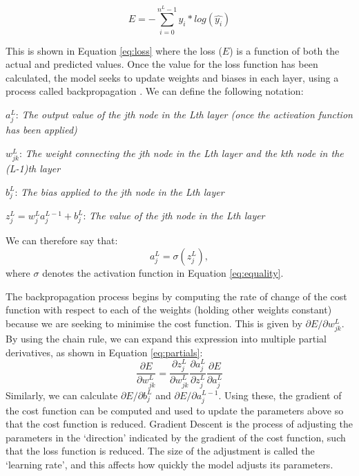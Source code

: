 \begin{equation}\label{eq:loss}
    E = -\sum_{i=0}^{n^L-1} y_i*log(\hat{y_i})
\end{equation}

This is shown in Equation \ref{eq:loss} where the loss ($E$) is a function of both the actual and predicted values. Once the value for the loss function has been calculated, the model seeks to update weights and biases in each layer, using a process called backpropagation \citep{Rumelhart, maths2015Nielsen}. We can define the following notation:

$a_j^L$: \textit{The output value of the jth node in the Lth layer (once the activation function has been applied)}

$w_{jk}^L$: \textit{The weight connecting the jth node in the Lth layer and the kth node in the (L-1)th layer}

$b_j^L$: \textit{The bias applied to the jth node in the Lth layer}

$z_j^L = w_j^L a_j^{L-1} + b_j^L$: \textit{The value of the jth node in the Lth layer}

We can therefore say that:
\begin{equation}\label{eq:equality}
    a_j^L = \sigma(z_j^L),
\end{equation}
where $\sigma$ denotes the activation function in Equation \ref{eq:equality}.

The backpropagation process begins by computing the rate of change of the cost function with respect to each of the weights (holding other weights constant) because we are seeking to minimise the cost function. This is given by $\partial E/ \partial w_{jk}^L$.
By using the chain rule, we can expand this expression into multiple partial derivatives, as shown in Equation \ref{eq:partials}:
\begin{equation}\label{eq:partials}
    \frac{\partial E}{\partial w_{jk}^L} = \frac{\partial z_j^L}{\partial w_{jk}^L} \frac{\partial a_j^L}{\partial z_j^L} \frac{\partial E}{\partial a_j^L} %
\end{equation}
Similarly, we can calculate $\partial E/ \partial b_j^L$ and $\partial E/ \partial a_j^{L-1}$. Using these, the gradient of the cost function can be computed and used to update the parameters above so that the cost function is reduced. Gradient Descent is the process of adjusting the parameters in the `direction' indicated by the gradient of the cost function, such that the loss function is reduced. The size of the adjustment is called the `learning rate', and this affects how quickly the model adjusts its parameters.

